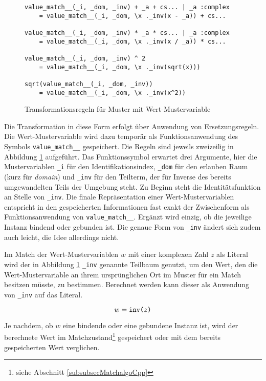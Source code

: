 \begin{figure}
\begin{unbreakable}\begin{verbatim}
value_match__(_i, _dom, _inv) + _a + cs... | _a :complex 
    = value_match__(_i, _dom, \x ._inv(x - _a)) + cs...
        
value_match__(_i, _dom, _inv) * _a * cs... | _a :complex 
    = value_match__(_i, _dom, \x ._inv(x / _a)) * cs...
        
value_match__(_i, _dom, _inv) ^ 2
    = value_match__(_i, _dom, \x ._inv(sqrt(x)))
        
sqrt(value_match__(_i, _dom, _inv))
    = value_match__(_i, _dom, \x ._inv(x^2))
\end{verbatim}\end{unbreakable}
\caption{Transformationsregeln für Muster mit Wert-Mustervariable}
\label{figWertMusterBau}
\end{figure}

Die Transformation in diese Form erfolgt über Anwendung von Ersetzungsregeln. Die Wert-Mustervariable wird dazu temporär als Funktionsanwendung des Symbols \verb|value_match__| gespeichert. Die Regeln sind jeweils zweizeilig in Abbildung \ref{figWertMusterBau} aufgeführt. Das Funktionssymbol erwartet drei Argumente, hier die Mustervariablen \verb|_i| für den Identifikationsindex, \verb|_dom| für den erlauben Raum (kurz für \textit{domain}) und \verb|_inv| für den Teilterm, der für Inverse des bereits umgewandelten Teils der Umgebung steht. Zu Beginn steht die Identitätsfunktion an Stelle von \verb|_inv|.
Die finale Repräsentation einer Wert-Mustervariablen entspricht in den gespeicherten Informationen fast exakt der Zwischenform als Funktionsanwendung von \verb|value_match__|. 
Ergänzt wird einzig, ob die jeweilige Instanz bindend oder gebunden ist. Die genaue Form von \verb|_inv| ändert sich zudem auch leicht, die Idee allerdings nicht. 

Im Match der Wert-Mustervariablen $w$ mit einer komplexen Zahl $z$ als Literal wird der in Abbildung \ref{figWertMusterBau} \verb|_inv| genannte Teilbaum genutzt, um den Wert, den die Wert-Mustervariable an ihrem ursprünglichen Ort im Muster für ein Match besitzen müsste, zu bestimmen. Berechnet werden kann dieser als Anwendung von \verb|_inv| auf das Literal. 

$$w = \verb|inv(|z\verb|)|$$

Je nachdem, ob $w$ eine bindende oder eine gebundene Instanz ist, wird der berechnete Wert im Matchzustand\footnote{siehe Abschnitt \ref{subsubsecMatchalgoCpp}} gespeichert oder mit dem bereits gespeicherten Wert verglichen.

